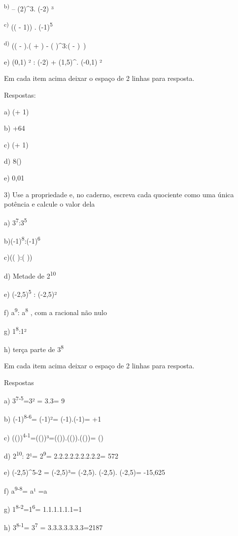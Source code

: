 \textsuperscript{b)} -- (2)^3{.} (-2) ³

\textsuperscript{c)} (( - 1)) . (-1)\textsuperscript{5}

\textsuperscript{d)}
(\left( -  \right).\left( +  \right) - \left(  \right)^{3}:( - )\ )

e) (0,1) ² : (-2) + (1,5)^{.} (-0,1) ²

Em cada item acima deixar o espaço de 2 linhas para resposta.

Respostas:

a) (+ 1)

b) +64

c) (+ 1)

d) 8()

e) 0,01

3) Use a propriedade e, no caderno, escreva cada quociente como uma
única potência e calcule o valor dela

a) 3\textsuperscript{7}:3\textsuperscript{5}

b)(-1)\textsuperscript{8}:(-1)\textsuperscript{6}

c)(\left(  \right):\left(  \right))

d) Metade de 2\textsuperscript{10}

e) (-2,5)\textsuperscript{5} : (-2,5)²

f) a\textsuperscript{9}: a\textsuperscript{8} , com a racional não nulo

g) 1\textsuperscript{8}:1²

h) terça parte de 3\textsuperscript{8}

Em cada item acima deixar o espaço de 2 linhas para resposta.

Respostas

a) 3\textsuperscript{7-5}=3² = 3.3= 9

b) (-1)\textsuperscript{8-6}= (-1)²= (-1).(-1)= +1

c)
(())\textsuperscript{4-1}=(())³=(()).(()).(())=
()

d) 2\textsuperscript{10}: 2¹= 2\textsuperscript{9}= 2.2.2.2.2.2.2.2.2=
572

e) (-2,5)^{5-2} = (-2,5)³= (-2,5). (-2,5). (-2,5)=
-15,625

f) a\textsuperscript{9-8}= a¹ =a

g) 1\textsuperscript{8-2}=1\textsuperscript{6}= 1.1.1.1.1.1=1

h) 3\textsuperscript{8-1}= 3\textsuperscript{7} = 3.3.3.3.3.3.3=2187

